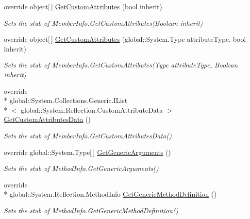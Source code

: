 \begin{DoxyCompactItemize}
override object\mbox{[}$\,$\mbox{]} \hyperlink{class_system_1_1_reflection_1_1_fakes_1_1_stub_method_info_a08327c621d22bc97656935029226476a}{Get\-Custom\-Attributes} (bool inherit)
\begin{DoxyCompactList}\small\item\em Sets the stub of Member\-Info.\-Get\-Custom\-Attributes(\-Boolean inherit)\end{DoxyCompactList}\item 
override object\mbox{[}$\,$\mbox{]} \hyperlink{class_system_1_1_reflection_1_1_fakes_1_1_stub_method_info_a879a146b4300593296fb1c7cca71bb4a}{Get\-Custom\-Attributes} (global\-::\-System.\-Type attribute\-Type, bool inherit)
\begin{DoxyCompactList}\small\item\em Sets the stub of Member\-Info.\-Get\-Custom\-Attributes(\-Type attribute\-Type, Boolean inherit)\end{DoxyCompactList}\item 
override \\*
global\-::\-System.\-Collections.\-Generic.\-I\-List\\*
$<$ global\-::\-System.\-Reflection.\-Custom\-Attribute\-Data $>$ \hyperlink{class_system_1_1_reflection_1_1_fakes_1_1_stub_method_info_af306770aad500f4c83404538a2a8acb5}{Get\-Custom\-Attributes\-Data} ()
\begin{DoxyCompactList}\small\item\em Sets the stub of Member\-Info.\-Get\-Custom\-Attributes\-Data()\end{DoxyCompactList}\item 
override global\-::\-System.\-Type\mbox{[}$\,$\mbox{]} \hyperlink{class_system_1_1_reflection_1_1_fakes_1_1_stub_method_info_a71e833bd9ecb31bb93a53b6979479e4a}{Get\-Generic\-Arguments} ()
\begin{DoxyCompactList}\small\item\em Sets the stub of Method\-Info.\-Get\-Generic\-Arguments()\end{DoxyCompactList}\item 
override \\*
global\-::\-System.\-Reflection.\-Method\-Info \hyperlink{class_system_1_1_reflection_1_1_fakes_1_1_stub_method_info_aee05aeb368e1ea123f3807922b7e76a1}{Get\-Generic\-Method\-Definition} ()
\begin{DoxyCompactList}\small\item\em Sets the stub of Method\-Info.\-Get\-Generic\-Method\-Definition()\end{DoxyCompactList}\item 

\end{DoxyCompactItemize}
